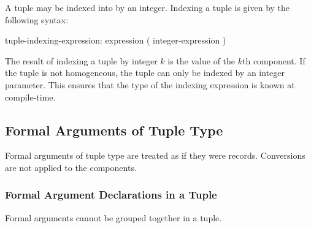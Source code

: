 A tuple may be indexed into by an integer.  Indexing a tuple is given
by the following syntax:
\begin{syntax}
tuple-indexing-expression:
  expression ( integer-expression )
\end{syntax}

The result of indexing a tuple by integer $k$ is the value of the
$k$th component.  If the tuple is not homogeneous, the tuple can only
be indexed by an integer parameter.  This ensures that the type of the
indexing expression is known at compile-time.

\subsection{Formal Arguments of Tuple Type}
\label{Formal_Arguments_of_Tuple_Type}


\begin{status}
Formal arguments of tuple type are treated as if they were records.
Conversions are not applied to the components.
\end{status}

\subsubsection{Formal Argument Declarations in a Tuple}
\label{Formal_Argument_Declarations_in_a_Tuple}


\begin{status}
Formal arguments cannot be grouped together in a tuple.
\end{status}
